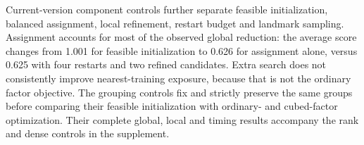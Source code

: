 Current-version component controls further separate feasible initialization,
balanced assignment, local refinement, restart budget and landmark sampling.
Assignment accounts for most of the observed global reduction: the average
score changes from 1.001 for feasible initialization to 0.626 for assignment
alone, versus 0.625 with four restarts and two refined candidates. Extra search
does not consistently improve nearest-training exposure, because that is not
the ordinary factor objective.
The grouping controls fix and strictly preserve the same groups before
comparing their feasible initialization with ordinary- and cubed-factor
optimization. Their complete global, local and timing results accompany the
rank and dense controls in the supplement.
